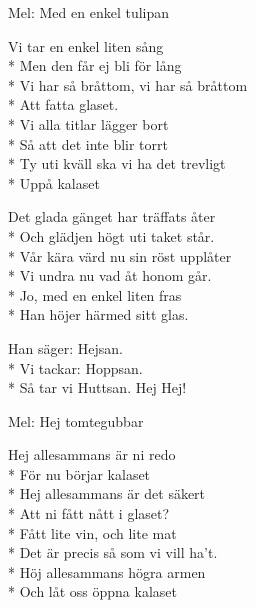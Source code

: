\pagestyle{Phörphesten}
\begin{SongText}
    \begin{SongInfo}
        Mel: Med en enkel tulipan
    \end{SongInfo}
    \begin{SongVerse}
        Vi tar en enkel liten sång\\*%
        Men den får ej bli för lång\\*%
        Vi har så bråttom, vi har så bråttom\\*%
        Att fatta glaset.\\*%
        Vi alla titlar lägger bort\\*%
        Så att det inte blir torrt\\*%
        Ty uti kväll ska vi ha det trevligt\\*%
        Uppå kalaset
    \end{SongVerse}
    \begin{SongVerse}
        Det glada gänget har träffats åter\\*%
        Och glädjen högt uti taket står.\\*%
        Vår kära värd nu sin röst upplåter\\*%
        Vi undra nu vad åt honom går.\\*%
        Jo, med en enkel liten fras\\*%
        Han höjer härmed sitt glas.
    \end{SongVerse}
    \begin{SongVerse}
        Han säger: Hejsan.\\*%
        Vi tackar: Hoppsan.\\*%
        Så tar vi Huttsan. Hej Hej!
    \end{SongVerse}
\end{SongText}
\begin{SongText}
    \begin{SongInfo}
        Mel: Hej tomtegubbar
    \end{SongInfo}
    \begin{SongVerse}
        Hej allesammans är ni redo\\*%
        För nu börjar kalaset\\*%
        Hej allesammans är det säkert\\*%
        Att ni fått nått i glaset?\\*%
        Fått lite vin, och lite mat\\*%
        Det är precis så som vi vill ha’t.\\*%
        Höj allesammans högra armen\\*%
        Och låt oss öppna kalaset
    \end{SongVerse}
\end{SongText}
